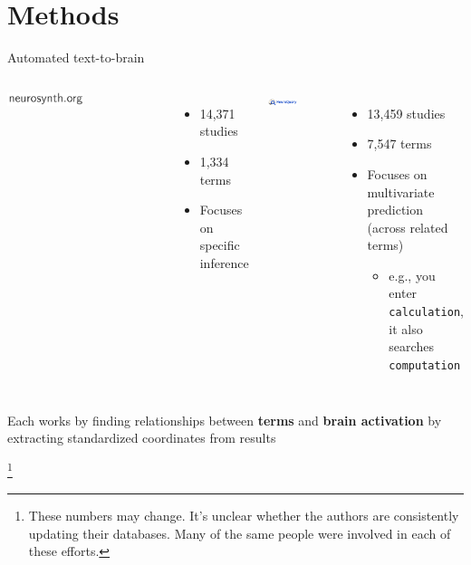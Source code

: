 \documentclass[aspectratio=169]{beamer}
\newcommand\blfootnote[1]{%
	\begingroup
	\renewcommand\thefootnote{}\footnote{#1}%
	\addtocounter{footnote}{-1}%
	\endgroup
}
\begin{document}





\section{Methods}



\begin{frame}{Automated text-to-brain}

	
	\begin{columns}[t]
			\includegraphics[width=0.5\textwidth]{neurosynth}\cite{YarkoniEtAl2011}
			
			\begin{itemize}
				\item 14,371 studies
				\item 1,334 terms
				\item Focuses on specific inference
			\end{itemize}
			
			\includegraphics[width=0.5\textwidth]{neuroquery}\cite{DockesEtAl2020}
			
			\begin{itemize}
				\item 13,459 studies
				\item 7,547 terms
				\item Focuses on multivariate prediction (across related terms)
				\begin{itemize}
					\item e.g., you enter \texttt{calculation}, it also searches \texttt{computation}
				\end{itemize}
			\end{itemize}
	\end{columns}
	
	\pause
	\begin{block}{}
				Each works by finding relationships between \textbf{terms} and \textbf{brain activation} by extracting standardized coordinates from results
	\end{block}


	\blfootnote{\tiny These numbers may change. It's unclear whether the authors are consistently updating their databases. Many of the same people were involved in each of these efforts.}
\end{frame}
\end{document}
